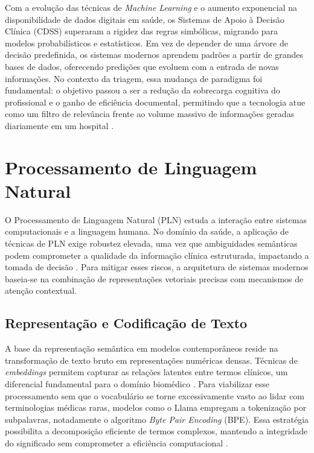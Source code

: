 Com a evolução das técnicas de \textit{Machine Learning} e o aumento exponencial na 
disponibilidade de dados digitais em saúde, os Sistemas de Apoio à Decisão Clínica (CDSS) 
superaram a rigidez das regras simbólicas, migrando para modelos probabilísticos e estatísticos. 
Em vez de depender de uma árvore de decisão predefinida, os sistemas modernos aprendem padrões 
a partir de grandes bases de dados, oferecendo predições que evoluem com a entrada de novas 
informações. No contexto da triagem, essa mudança de paradigma foi fundamental: o objetivo 
passou a ser a redução da sobrecarga cognitiva do profissional e o ganho de eficiência documental, 
permitindo que a tecnologia atue como um filtro de relevância frente ao volume massivo de 
informações geradas diariamente em um hospital \cite{richens2020,shortliffe1975}.

\section{Processamento de Linguagem Natural}

O Processamento de Linguagem Natural (PLN) estuda a interação entre sistemas computacionais e 
a linguagem humana. No domínio da saúde, a aplicação de técnicas de PLN exige robustez elevada, 
uma vez que ambiguidades semânticas podem comprometer a qualidade da informação clínica 
estruturada, impactando a tomada de decisão \cite{devlin2018,lee2020}. Para mitigar esses 
riscos, a arquitetura de sistemas modernos baseia-se na combinação de representações vetoriais 
precisas com mecanismos de atenção contextual.

\subsection{Representação e Codificação de Texto}
A base da representação semântica em modelos contemporâneos reside na transformação de texto 
bruto em representações numéricas densas. Técnicas de \textit{embeddings} permitem capturar 
as relações latentes entre termos clínicos, um diferencial fundamental para o domínio biomédico 
\cite{devlin2018,lee2020}. Para viabilizar esse processamento sem que o vocabulário se torne 
excessivamente vasto ao lidar com terminologias médicas raras, modelos como o Llama empregam a 
tokenização por subpalavras, notadamente o algoritmo \textit{Byte Pair Encoding} (BPE). Essa
estratégia possibilita a decomposição eficiente de termos complexos, mantendo a integridade do 
significado sem comprometer a eficiência computacional \cite{llama3herd2024,metaai2024}.

